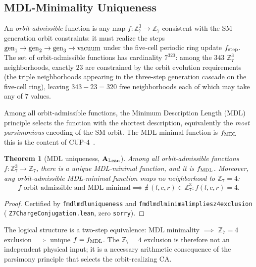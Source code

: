 \documentclass[11pt]{article}
\newtheorem{theorem}{Theorem}[section]
\theoremstyle{remark}
\newcommand{\lean}[1]{%
  \penalty-100
  \begingroup\def\_{\textunderscore\allowbreak}\texttt{#1}\endgroup}
\newcommand{\CatAL}{\ensuremath{\textbf{A}_{\rm Lean}}}
\begin{document}
\subsection{MDL-Minimality Uniqueness}
\label{sec:mdl_uniqueness}

An \emph{orbit-admissible} function is any map $f: \mathbb{Z}_7^3 \to \mathbb{Z}_7$
consistent with the SM generation orbit constraints: it must realize the steps
${\rm gen}_1 \to {\rm gen}_2 \to {\rm gen}_3 \to {\rm vacuum}$ under the five-cell
periodic ring update $f_{\rm step}$.
The set of orbit-admissible functions has cardinality $7^{320}$: among the $343$
$\mathbb{Z}_7^3$ neighborhoods, exactly $23$ are constrained by the orbit evolution
requirements (the triple neighborhoods appearing in the three-step generation cascade on
the five-cell ring), leaving $343 - 23 = 320$ free neighborhoods each of which may take
any of $7$ values.

Among all orbit-admissible functions, the Minimum Description Length (MDL) principle
selects the function with the shortest description, equivalently the \emph{most parsimonious}
encoding of the SM orbit.
The MDL-minimal function is $f_{\rm MDL}$ --- this is the content of CUP-4~\cite{SpivackCompUniversality}.

\begin{theorem}[MDL uniqueness, $\CatAL$]\label{thm:mdl_uniqueness}
Among all orbit-admissible functions $f: \mathbb{Z}_7^3 \to \mathbb{Z}_7$, there is a unique
MDL-minimal function, and it is $f_{\rm MDL}$.
Moreover, any orbit-admissible MDL-minimal function maps no neighborhood to $\mathbb{Z}_7 = 4$:
\[
f \text{ orbit-admissible and MDL-minimal} \implies \nexists\,(l,c,r) \in \mathbb{Z}_7^3 : f(l,c,r) = 4.
\]
\end{theorem}

\begin{proof}
Certified by \lean{fmdl\_mdl\_uniqueness} and
\lean{fmdl\_mdl\_minimal\_\allowbreak{}implies\_z4\_exclusion}
(\lean{Z7ChargeConjugation.lean}, zero \texttt{sorry}).
\end{proof}

The logical structure is a two-step equivalence:
MDL minimality $\implies$ $\mathbb{Z}_7 = 4$ exclusion $\implies$ unique $f = f_{\rm MDL}$.
The $\mathbb{Z}_7 = 4$ exclusion is therefore not an independent physical input; it is
a necessary arithmetic consequence of the parsimony principle that selects the
orbit-realizing CA.
\end{document}
